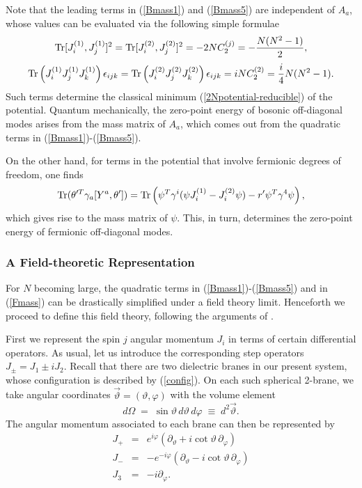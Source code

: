 \documentclass[a4paper,12pt]{article}
\begin{document}
Note that the leading terms in (\ref{Bmass1}) and (\ref{Bmass5}) are independent of $A_{a}$, whose values can be evaluated via the following simple formulae
\begin{equation}
{\rm Tr}[J^{(1)}_{i},J^{(1)}_{j}]^{2}={\rm Tr}[J^{(2)}_{i},J^{(2)}_{j}]^{2}=
-2NC_{2}^{(j)}=-\frac{N(N^{2}-1)}{2},
\end{equation}
\begin{equation}
{\rm Tr}\left(J^{(1)}_{i}J^{(1)}_{j}J^{(1)}_{k}\right)\epsilon_{ijk}
={\rm Tr}\left(J^{(2)}_{i}J^{(2)}_{j}J^{(2)}_{k}\right)\epsilon_{ijk}
=iNC_{2}^{(2)}=\frac{i}{4}N(N^{2}-1).
\end{equation}
Such terms determine the classical minimum (\ref{2Npotential-reducible}) of the potential. Quantum mechanically, the zero-point energy of bosonic off-diagonal modes arises from the mass matrix of $A_{a}$, which comes out from the quadratic terms in (\ref{Bmass1})-(\ref{Bmass5}). 

On the other hand, for terms in the potential that involve fermionic degrees of freedom, one finds
\begin{equation}
{\rm Tr}(\theta'^{T}\gamma_{a}[Y^{a},\theta'])={\rm Tr}\left(\psi^{T}\gamma^{i}(\psi J^{(1)}_{i}-J^{(2)}_{i}\psi)-r'\psi^{T}\gamma^{4}\psi\right),
\label{Fmass}
\end{equation}
which gives rise to the mass matrix of $\psi$. This, in turn, determines the zero-point energy of fermionic off-diagonal modes.
\subsubsection{A Field-theoretic Representation}
For $N$ becoming large, the quadratic terms in (\ref{Bmass1})-(\ref{Bmass5}) and in (\ref{Fmass}) can be drastically simplified under a field theory limit. Henceforth we proceed to define this field theory, following the arguments of \cite{AB}. 

First we represent the spin $j$ angular momentum $J_{i}$ in terms of certain differential operators. As usual, let us introduce the corresponding step operators $J_{\pm}=J_{1}\pm iJ_{2}$. Recall that there are two dielectric branes in our present system, whose configuration is described by (\ref{config}). On each such spherical 2-brane, we take angular coordinates $\vec{\vartheta} = (\vartheta,\varphi)$ with the volume element
\begin{equation}
d\Omega \;=\; \sin \vartheta\, d\vartheta\, d\varphi\;\equiv \;d^{2}\vec{\vartheta}.
\label{vol}
\end{equation}
The angular momentum associated to each brane can then be represented by
\begin{eqnarray}
J_+ &=& e^{i\varphi} ( \partial_\vartheta 
               + i \cot \vartheta \,\partial_\varphi)\nonumber\\
J_- &=&  -e^{-i\varphi} (\partial_\vartheta 
               - i\cot \vartheta\, \partial_\varphi)\nonumber\\
J_3 &=& -i \partial_\varphi.
\label{DiffOperator}
\end{eqnarray}
\end{document}
